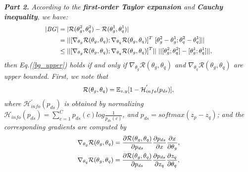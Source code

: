 \noindent \emph{\textbf{Part 2.}}
\noindent \emph{According to the \textbf{first-order Taylor expansion} and \textbf{Cauchy inequality}, we have:}
\begin{equation}
\begin{small}
\begin{aligned}
|\text{\emph{BG}}|&=|\mathcal{R}(\theta^2_g,\theta^2_q)-\mathcal{R}(\theta_g^1,\theta_q^1)| \\
&= || [\nabla_{\theta_g} \mathcal{R}(\theta_g,\theta_q);\nabla_{\theta_q} \mathcal{R}(\theta_g,\theta_q)]^T \  [\theta^2_g-\theta_g^1;\theta^2_q-\theta_q^1] || \\
&\le || [\nabla_{\theta_g} \mathcal{R}(\theta_g,\theta_q);\nabla_{\theta_q} \mathcal{R}(\theta_g,\theta_q)]^T|| \  ||[\theta^2_g;\theta^2_q]-[\theta_g^1;\theta_q^1]||,
\end{aligned}
\end{small}
\label{}
\end{equation}
 \emph{then Eq.(\ref{bg_upper}) holds if and only if $\nabla_{\theta_g} \mathcal{R}(\theta_g,\theta_q)$ and $\nabla_{\theta_q} \mathcal{R}(\theta_g,\theta_q)$ are upper bounded. }
\noindent \emph{First, we note that }
\begin{equation}
\begin{small}
\begin{aligned}
\mathcal{R}(\theta_g,\theta_q)=\mathbb{E}_{z,y}[1-\mathcal{H}^{'}_{info}(p_{ds})],
\end{aligned}
\end{small}
\label{}
\end{equation}
\noindent \emph{where $\mathcal{H}^{'}_{info}(p_{ds})$ is obtained by normalizing $\mathcal{H}_{info}(p_{ds})=\sum^{C}_{c=1} p_{ds}(c)log\frac{1}{p_{ds}(c)}$, and $p_{ds}=softmax(z_p- z_q)$; }
\noindent \emph{and the corresponding gradients are computed by }
\begin{equation}
\begin{small}
\begin{aligned}
& \nabla_{\theta_g} \mathcal{R}(\theta_g,\theta_q)=\frac{\partial \mathcal{R}(\theta_g,\theta_q)}{\partial p_{ds}}   \frac{\partial p_{ds}}{\partial x} \frac{\partial x}{\partial \theta_g},  \\
& \nabla_{\theta_q} \mathcal{R}(\theta_g,\theta_q)=\frac{\partial \mathcal{R}(\theta_g,\theta_q)}{\partial p_{ds}}   \frac{\partial p_{ds}}{\partial z_q} \frac{\partial z_q}{\partial \theta_q},
\end{aligned}
\end{small}
\label{}
\end{equation}
